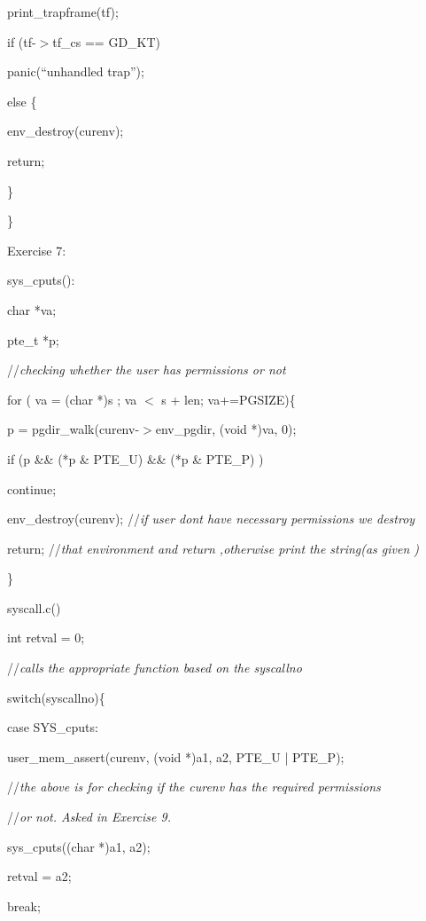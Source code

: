 \documentclass[a4paper,portrait,12pt]{article}
\begin{document}
		print\_trapframe(tf);


		if (tf-$>$tf\_cs == GD\_KT)


			panic({``}unhandled trap'');


		else \{


			env\_destroy(curenv);


			return;


		\}


	\}





Exercise 7:





sys\_cputs():


	char *va;


	pte\_t *p;


	//\emph{checking whether the user has permissions or not}


	for ( va = (char *)s ; va $<$ s + len; va+=PGSIZE)\{


		p = pgdir\_walk(curenv-$>$env\_pgdir, (void *)va, 0);


		if (p \&\& (*p \& PTE\_U) \&\& (*p \& PTE\_P) )


			continue;


		env\_destroy(curenv); //\emph{if user dont have necessary permissions we destroy}


		return; //\emph{that environment and return ,otherwise print the string(as given )}


	\}





syscall.c()





	int retval = 0;


	//\emph{calls the appropriate function based on the syscallno}


	switch(syscallno)\{


		case SYS\_cputs:



			user\_mem\_assert(curenv, (void *)a1, a2, PTE\_U | PTE\_P);


			//\emph{the above is for checking if the curenv has the required permissions}


			//\emph{or not. Asked in Exercise 9.}


			sys\_cputs((char *)a1, a2);


			retval = a2;


			break;
\end{document}
